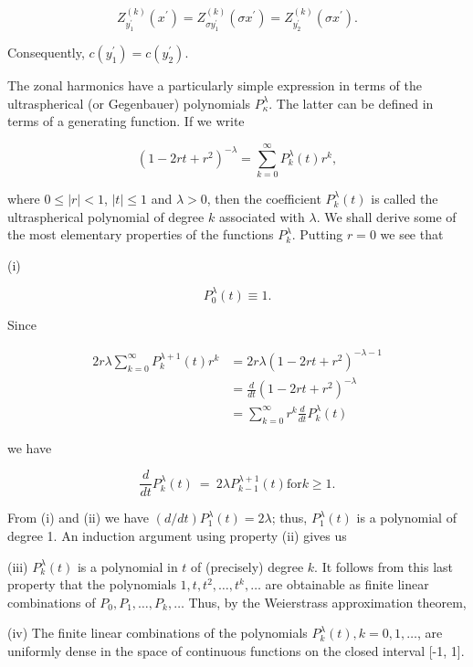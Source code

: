 \[
Z_{y_{1}^{\prime}}^{(k)}(x^{\prime})=Z_{\sigma y_{1}^{\prime}}^{(k)}(\sigma x^{\prime})=Z_{y_{2}^{\prime}}^{(k)}(\sigma x^{\prime}).
\]

Consequently, $c(y_{1}^{\prime}) = c(y_{2}^{\prime})$.

The zonal harmonics have a particularly simple expression in terms of the ultraspherical (or Gegenbauer) polynomials $P_{\kappa}^{\lambda}$. The latter can be defined in terms of a generating function. If we write

\[
(1-2rt+r^{2})^{-\lambda}=\sum_{k=0}^{\infty}P_{k}^{\lambda}(t)r^{k},
\]

where $0 \leq |r| < 1$, $|t| \leq 1$ and $\lambda > 0$, then the coefficient $P_k^\lambda(t)$ is called the ultraspherical polynomial of degree $k$ associated with $\lambda$. We shall derive some of the most elementary properties of the functions $P_k^\lambda$. Putting $r = 0$ we see that

(i)

\[
P_{0}^{\lambda}(t)\equiv1.
\]

Since

\[
\begin{aligned}2r\lambda\sum_{k=0}^{\infty}P_{k}^{\lambda+1}(t)r^{k}&=2r\lambda(1-2rt+r^{2})^{-\lambda-1}\\&=\frac{d}{dt}(1-2rt+r^{2})^{-\lambda}\\&=\sum_{k=0}^{\infty}r^{k}\frac{d}{dt}P_{k}^{\lambda}(t)\end{aligned}
\]

we have

\begin{equation}
\tag{ii}
\frac{d}{d t}P_{k}^{\lambda}(t)\:=\:2\lambda P_{k-1}^{\lambda+1}(t)\text{for}k\geq1.
\end{equation}

From (i) and (ii) we have $(d/dt)P_1^\lambda(t) = 2\lambda$; thus, $P_1^\lambda(t)$ is a polynomial of degree 1. An induction argument using property (ii) gives us

(iii) $P_{k}^\lambda(t)$ is a polynomial in $t$ of (precisely) degree $k$. It follows from this last property that the polynomials $1, t, t^2, \ldots, t^k, \ldots$ are obtainable as finite linear combinations of $P_0, P_1, \ldots, P_k, \ldots$ Thus, by the Weierstrass approximation theorem,

(iv) The finite linear combinations of the polynomials $P_k^\lambda(t), k = 0, 1, \ldots$, are uniformly dense in the space of continuous functions on the closed interval [-1, 1].

